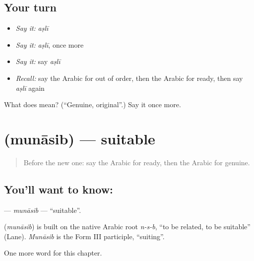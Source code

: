 \subsection*{Your turn}
\begin{itemize}
\raggedright
  \item \emph{Say it:} \emph{aṣlī}
  \item \emph{Say it:} \emph{aṣlī}, once more
  \item \emph{Say it:} say \emph{aṣlī}
  \item \emph{Recall:} say the Arabic for out of order, then the Arabic for ready, then say \emph{aṣlī} again
\end{itemize}

\begin{tcolorbox}[breakable,colback=teal!4,colframe=teal!35!black,title={Before you move on}]
What does  mean? (\textquotedblleft{}Genuine, original\textquotedblright{}.) Say it once more.
\end{tcolorbox}
\section[\texorpdfstring{\ar{مناسب} (munāsib)}{مناسب (munāsib)}]{ (munāsib) — suitable}

\label{lesson:AR-C240-munasib}



\begin{quote}
Before the new one: say the Arabic for ready, then the Arabic for genuine.
\end{quote}

\subsection*{You'll want to know: }
\textbf{} — \emph{munāsib} — \textquotedblleft{}suitable\textquotedblright{}.

\begin{cousinweb}
\textbf{} (\emph{munāsib}) is built on the native Arabic root \emph{n-s-b}, \textquotedblleft{}to be related, to be suitable\textquotedblright{} (Lane). \emph{Munāsib} is the Form III participle, \textquotedblleft{}suiting\textquotedblright{}.
\end{cousinweb}

\begin{grammarlens}[title={What you've built}]
One more word for this chapter.
\end{grammarlens}

